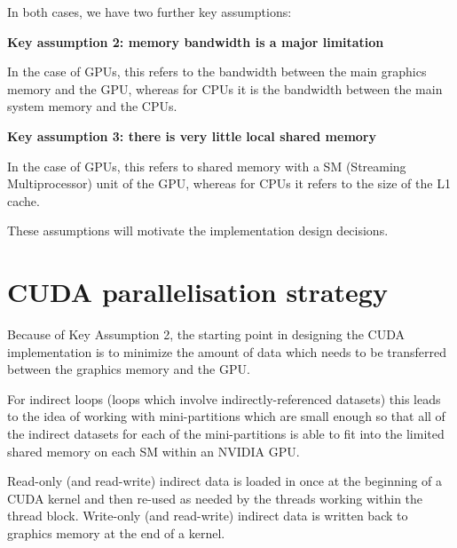 \documentclass[12pt]{article}
\begin{document}
In both cases, we have two further key assumptions:

\vspace{0.1in}
{\bf Key assumption 2: memory bandwidth is a major limitation}
\vspace{0.1in}

In the case of GPUs, this refers to the bandwidth between the main
graphics memory and the GPU, whereas for CPUs it is the bandwidth between
the main system memory and the CPUs.

\vspace{0.1in}
{\bf Key assumption 3: there is very little local shared memory}
\vspace{0.1in}

In the case of GPUs, this refers to shared memory with a SM
(Streaming Multiprocessor) unit of the GPU, whereas for CPUs it
refers to the size of the L1 cache.


These assumptions will motivate the implementation design decisions.




\newpage

\section{CUDA parallelisation strategy}

Because of Key Assumption 2, the starting point in designing the
CUDA implementation is to minimize the amount of data which needs
to be transferred between the graphics memory and the GPU.

For indirect loops (loops which involve indirectly-referenced datasets)
this leads to the idea of working with mini-partitions which are small
enough so that all of the indirect datasets for each of the mini-partitions
is able to fit into the limited shared memory on each SM within an NVIDIA
GPU.

Read-only (and read-write) indirect data is loaded in once at the beginning
of a CUDA kernel and then re-used as needed by the threads working within
the thread block.  Write-only (and read-write) indirect data is written
back to graphics memory at the end of a kernel.
\end{document}

